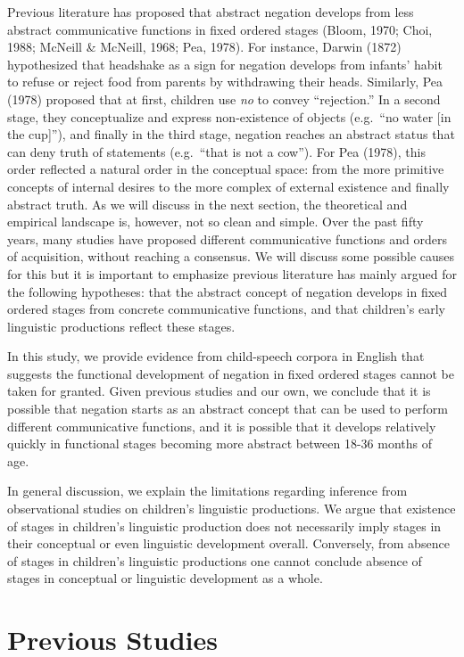 \documentclass[
  english,
  man,floatsintext]{apa6}
\begin{document}
Previous literature has proposed that abstract negation develops from less abstract communicative functions in fixed ordered stages (Bloom, 1970; Choi, 1988; McNeill \& McNeill, 1968; Pea, 1978). For instance, Darwin (1872) hypothesized that headshake as a sign for negation develops from infants' habit to refuse or reject food from parents by withdrawing their heads. Similarly, Pea (1978) proposed that at first, children use \emph{no} to convey ``rejection.'' In a second stage, they conceptualize and express non-existence of objects (e.g.~``no water {[}in the cup{]}''), and finally in the third stage, negation reaches an abstract status that can deny truth of statements (e.g.~``that is not a cow''). For Pea (1978), this order reflected a natural order in the conceptual space: from the more primitive concepts of internal desires to the more complex of external existence and finally abstract truth. As we will discuss in the next section, the theoretical and empirical landscape is, however, not so clean and simple. Over the past fifty years, many studies have proposed different communicative functions and orders of acquisition, without reaching a consensus. We will discuss some possible causes for this but it is important to emphasize previous literature has mainly argued for the following hypotheses: that the abstract concept of negation develops in fixed ordered stages from concrete communicative functions, and that children's early linguistic productions reflect these stages.

In this study, we provide evidence from child-speech corpora in English that suggests the functional development of negation in fixed ordered stages cannot be taken for granted. Given previous studies and our own, we conclude that it is possible that negation starts as an abstract concept that can be used to perform different communicative functions, and it is possible that it develops relatively quickly in functional stages becoming more abstract between 18-36 months of age.

In general discussion, we explain the limitations regarding inference from observational studies on children's linguistic productions. We argue that existence of stages in children's linguistic production does not necessarily imply stages in their conceptual or even linguistic development overall. Conversely, from absence of stages in children's linguistic productions one cannot conclude absence of stages in conceptual or linguistic development as a whole.

\hypertarget{previous-studies}{%
\section{Previous Studies}\label{previous-studies}}
\end{document}
